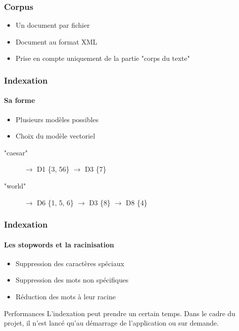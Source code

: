 \documentclass{beamer}
\begin{document}
\begin{frame}

\frametitle{Corpus}

\begin{itemize}
 \item Un document par fichier
 \item Document au format XML
 \item Prise en compte uniquement de la partie "corps du texte"
\end{itemize}

 
\end{frame}

\begin{frame}

\frametitle{Indexation}
\framesubtitle{Sa forme}

\begin{itemize}
 \item Plusieurs mod\`eles possibles
 \item Choix du mod\`ele vectoriel
\end{itemize}


\begin{description}
 \item["caesar"] $\rightarrow$ D1 \{3, 56\} $\rightarrow$ D3 \{7\}
 \item["world"] $\rightarrow$ D6 \{1, 5, 6\} $\rightarrow$ D3 \{8\} $\rightarrow$ D8 \{4\}
\end{description}
 
\end{frame}

\begin{frame}

\frametitle{Indexation}
\framesubtitle{Les stopwords et la racinisation}

\begin{itemize}
 \item Suppression des caract\`eres sp\'eciaux
 \item Suppression des mots non sp\'ecifiques
 \item R\'eduction des mots \`a leur racine
\end{itemize}

\begin{block}{Performances}
 L'indexation peut prendre un certain temps. Dans le cadre du projet, il n'est lanc\'e qu'au d\'emarrage de l'application ou sur demande.
\end{block}

 
\end{frame}
\end{document}
